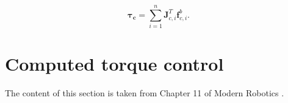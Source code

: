 \begin{equation}\label{eq:tauforcerel}
    \boldsymbol{\tau_c} = \sum_{i=1}^{n} \mathbf{J}^T_{c,i} \mathbf{f}^b_{c,i}.
\end{equation}












\section{Computed torque control}
The content of this section is taken from Chapter 11 of Modern Robotics \cite{lynch2017modernCompTorque}.

